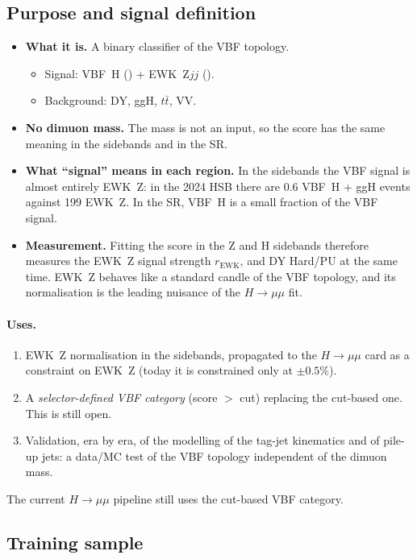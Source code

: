 \documentclass[11pt,a4paper]{article}
\begin{document}
\subsection{Purpose and signal definition}
\begin{itemize}
  \item \textbf{What it is.} A binary classifier of the VBF topology.
  \begin{itemize}
    \item Signal: VBF~H () + EWK~Z$jj$ ().
    \item Background: DY, ggH, $t\bar t$, VV.
  \end{itemize}
  \item \textbf{No dimuon mass.} The mass is not an input, so the score has the
  same meaning in the sidebands and in the SR.
  \item \textbf{What ``signal'' means in each region.} In the sidebands the VBF
  signal is almost entirely EWK~Z: in the 2024 HSB there are 0.6 VBF~H + ggH
  events against 199 EWK~Z. In the SR, VBF~H is a small fraction of the VBF
  signal.
  \item \textbf{Measurement.} Fitting the score in the Z and H sidebands
  therefore measures the EWK~Z signal strength $r_\text{EWK}$, and DY Hard/PU
  at the same time. EWK~Z behaves like a standard candle of the VBF topology,
  and its normalisation is the leading nuisance of the $H\to\mu\mu$ fit.
\end{itemize}

\paragraph{Uses.}
\begin{enumerate}
  \item EWK~Z normalisation in the sidebands, propagated to the $H\to\mu\mu$
  card as a constraint on EWK~Z (today it is constrained only at $\pm0.5\%$).
  \item A \emph{selector-defined VBF category} (score $>$ cut) replacing the
  cut-based one. This is still open.
  \item Validation, era by era, of the modelling of the tag-jet kinematics and
  of pile-up jets: a data/MC test of the VBF topology independent of the dimuon
  mass.
\end{enumerate}
The current $H\to\mu\mu$ pipeline still uses the cut-based VBF category.

\subsection{Training sample}
\end{document}
